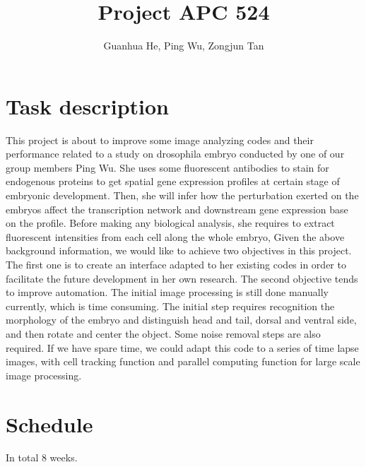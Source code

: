 \documentclass[a4paper,12pt]{article}
\title{Project APC 524}
\author{Guanhua He, Ping Wu, Zongjun Tan}
\theoremstyle{remark}
\numberwithin{equation}{section}
\begin{document}
 \maketitle
	
	
	\section{Task description}
	
This project is about to improve some image analyzing codes and their performance related to a study on drosophila embryo conducted by one of our group
members Ping Wu. She uses some fluorescent antibodies to stain for endogenous proteins to get spatial gene expression profiles at certain stage of embryonic development. Then, she will infer how the perturbation exerted on the embryos affect the transcription network and downstream gene expression base on the profile. Before making any biological analysis, she requires to extract fluorescent intensities from each cell along the whole embryo,
Given the above background information, we would like to achieve two objectives in this project. The first one is to create an interface adapted to her existing
codes in order to facilitate the future development in her own research. The second objective tends to improve automation. The initial image processing is still done manually currently, which is time consuming. The initial step requires recognition the morphology of the embryo and distinguish head and tail, dorsal and ventral side, and then rotate and center the object. Some noise removal steps are also required. If we have spare time, we could adapt this code to a series of time lapse images, with cell tracking function and parallel computing function for large scale image processing.

	\section{Schedule}
	In total 8 weeks.
	
\end{document}
